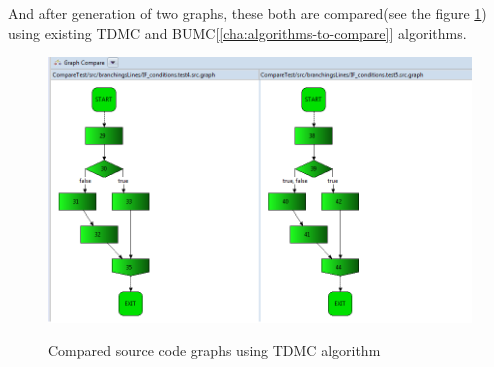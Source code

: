 \documentclass{report}
\begin{document}
And after generation of two graphs, these both are compared(see the figure \ref{fig:graphs-compared}) using existing TDMC and BUMC[\ref{cha:algorithms-to-compare}] algorithms.
\begin{figure}
  \centering
  \includegraphics[scale = 0.6]{Figures/Java-flowchart-exp/graphs-compared.png}\\[0.1cm]
  \caption[Compared source code graphs using TDMC algorithm \ref{sec:topdown} ]{Compared source code graphs using TDMC algorithm}
  \label{fig:graphs-compared}
\end{figure}
\end{document}
